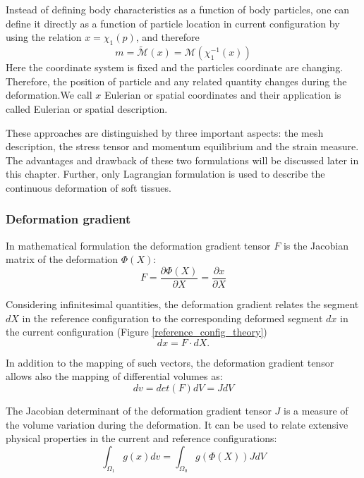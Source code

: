 Instead of defining body characteristics as a function of body particles, one can define it directly as a function of particle location in current configuration by using the relation $ x = \chi_1(p)$, and therefore 
$$m = \tilde{ \mathcal{M}}(x) = \mathcal{M}(\chi_1^{-1}(x))$$
 Here the coordinate system is fixed and the particles coordinate are changing. Therefore, the position of particle and any related quantity changes during the deformation.We call $x$ Eulerian or spatial coordinates and their application is called Eulerian or spatial description.
 
 These approaches are distinguished by three important aspects: the mesh description, the stress tensor and momentum equilibrium and the strain measure. The advantages and drawback of these two formulations will be discussed later in this chapter. Further, only Lagrangian formulation is used to describe the continuous deformation of soft tissues.       

\subsubsection*{Deformation gradient}\label{deformatiogradient}

In mathematical formulation the deformation gradient tensor $F$ is the Jacobian matrix of the deformation $\Phi(X)$:
\begin{equation}
F = \frac{\partial \Phi (X)}{\partial X} = \frac{\partial x}{\partial X}
\end{equation}

Considering infinitesimal quantities, the deformation gradient relates the segment $dX$ in the reference configuration to the corresponding deformed segment $dx$ in the current configuration (Figure \ref{reference_config_theory}) 
\begin{equation}
dx = F \cdot dX.
\label{deformationGradRelation}
\end{equation}

In addition to the mapping of such vectors, the deformation gradient tensor allows also the mapping of differential volumes as:
\begin{equation}
dv = det(F)dV = JdV
\end{equation}

The Jacobian determinant of the deformation gradient tensor $J$ is a measure of the volume variation during the deformation. It can be used to relate extensive physical properties in the current and reference configurations:
\begin{equation}
\int_{\Omega_1}g(x)dv = \int_{\Omega_0}g(\Phi(X))JdV
\label{JacobianRelation}
\end{equation}


